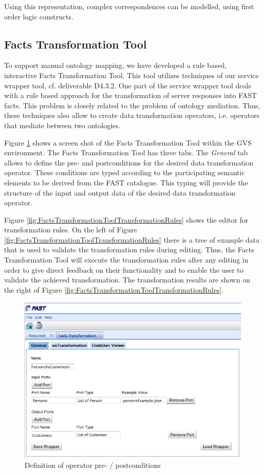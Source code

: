 Using this representation, complex correspondences can be modelled, using first order logic constructs.

\subsection{Facts Transformation Tool}

To support manual ontology mapping, we have developed a rule based, interactive Facts Transformation Tool. This tool utilizes techniques of our service wrapper tool, cf. deliverable D4.3.2. One part of the service wrapper tool deals with a rule based approach for the transformation of server responses into FAST facts. This problem is closely related to the problem of ontology mediation. Thus, these techniques also allow to create data transformation operators, i.e. operators that mediate between two ontologies.

Figure \ref{fig:FactsTransformationToolPortDefinitions} shows a screen shot of the  Facts Transformation Tool within the GVS environment. The Facts Transformation Tool has three tabs. The \textit{General} tab allows to define the pre- and postconditions for the desired data transformation operator. These conditions are  typed according to the participating semantic elements to be derived from the FAST catalogue. This typing will provide the structure of the input and output data of the desired data transformation operator.  

Figure \ref{fig:FactsTransformationToolTransformationRules} shows the editor for transformation rules. On the left of Figure \ref{fig:FactsTransformationToolTransformationRules} there is a tree of example data that is used to validate the transformation rules during editing. Thus, the Facts Transformation Tool will execute the transformation rules after any editing in order to give direct feedback on their functionality and to enable the user to validate the achieved transformation. The transformation results are shown on the right of Figure \ref{fig:FactsTransformationToolTransformationRules}. 


\begin{figure}
    \centering
    \includegraphics[width=0.8\linewidth]{images/FactsTransformationToolGVSWithPortDefinitionsNoGlitch2.png}
    \caption{Definition of operator pre- / postconditions}
    \label{fig:FactsTransformationToolPortDefinitions}
\end{figure}

